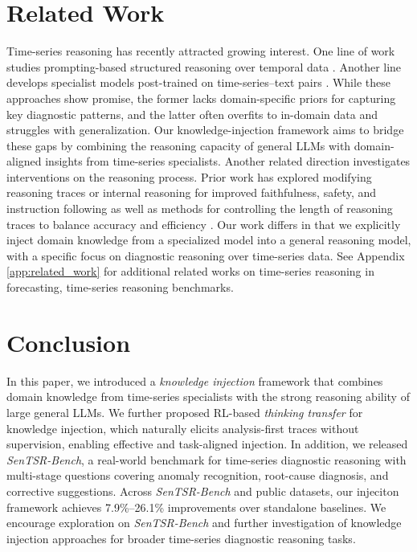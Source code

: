 \documentclass[twoside]{article}
\begin{document}
\section{Related Work}
Time-series reasoning has recently attracted growing interest. One line of work studies prompting-based structured reasoning over temporal data \citep{jiang2025explainable,liu2025evaluating,merrill2024language,liu2025picture}. Another line develops specialist models post-trained on time-series–text pairs \citep{kong2025time,xie2024chatts}. While these approaches show promise, the former lacks domain-specific priors for capturing key diagnostic patterns, and the latter often overfits to in-domain data and struggles with generalization. Our knowledge-injection framework aims to bridge these gaps by combining the reasoning capacity of general LLMs with domain-aligned insights from time-series specialists. Another related direction investigates interventions on the reasoning process. Prior work has explored modifying reasoning traces or internal reasoning for improved faithfulness, safety, and instruction following \citep{wu2025effectively,arcuschin2025chain,baker2025monitoring} as well as methods for controlling the length of reasoning traces to balance accuracy and efficiency \citep{han2024token,aggarwal2025l1,lee2025well}. Our work differs in that we explicitly inject domain knowledge from a specialized model into a general reasoning model, with a specific focus on diagnostic reasoning over time-series data. See Appendix \ref{app:related_work} for additional related works on time-series reasoning in forecasting, time-series reasoning benchmarks.
\section{Conclusion}  
In this paper, we introduced a \emph{knowledge injection} framework that combines domain knowledge from time-series specialists with the strong reasoning ability of large general LLMs. We further proposed RL-based \emph{thinking transfer} for knowledge injection, which naturally elicits analysis-first traces without supervision, enabling effective and task-aligned injection. In addition, we released \emph{SenTSR-Bench}, a real-world benchmark for time-series diagnostic reasoning with multi-stage questions covering anomaly recognition, root-cause diagnosis, and corrective suggestions. Across \textit{SenTSR-Bench} and public datasets, our injeciton framework achieves 7.9\%–26.1\% improvements over standalone baselines. We encourage exploration on \textit{SenTSR-Bench} and further investigation of knowledge injection approaches for broader time-series diagnostic reasoning tasks.
\end{document}
